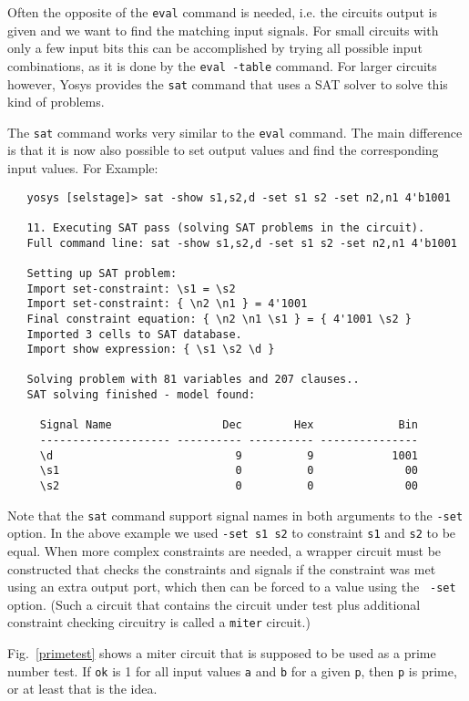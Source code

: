\documentclass[9pt,technote,a4paper]{IEEEtran}
\begin{document}
Often the opposite of the {\tt eval} command is needed, i.e. the circuits
output is given and we want to find the matching input signals. For small
circuits with only a few input bits this can be accomplished by trying all
possible input combinations, as it is done by the {\tt eval -table} command.
For larger circuits however, Yosys provides the {\tt sat} command that uses
a SAT \cite{CircuitSAT} solver \cite{MiniSAT} to solve this kind of problems.

The {\tt sat} command works very similar to the {\tt eval} command. The main
difference is that it is now also possible to set output values and find the
corresponding input values. For Example:

{\scriptsize
\begin{verbatim}
   yosys [selstage]> sat -show s1,s2,d -set s1 s2 -set n2,n1 4'b1001
   
   11. Executing SAT pass (solving SAT problems in the circuit).
   Full command line: sat -show s1,s2,d -set s1 s2 -set n2,n1 4'b1001
   
   Setting up SAT problem:
   Import set-constraint: \s1 = \s2
   Import set-constraint: { \n2 \n1 } = 4'1001
   Final constraint equation: { \n2 \n1 \s1 } = { 4'1001 \s2 }
   Imported 3 cells to SAT database.
   Import show expression: { \s1 \s2 \d }
   
   Solving problem with 81 variables and 207 clauses..
   SAT solving finished - model found:
   
     Signal Name                 Dec        Hex             Bin
     -------------------- ---------- ---------- ---------------
     \d                            9          9            1001
     \s1                           0          0              00
     \s2                           0          0              00
\end{verbatim}
}

Note that the {\tt sat} command support signal names in both arguments
to the {\tt -set} option. In the above example we used {\tt -set s1 s2}
to constraint {\tt s1} and {\tt s2} to be equal. When more complex
constraints are needed, a wrapper circuit must be constructed that
checks the constraints and signals if the constraint was met using an
extra output port, which then can be forced to a value using the {\tt
-set} option. (Such a circuit that contains the circuit under test
plus additional constraint checking circuitry is called a {\tt miter\/}
circuit.)

Fig.~\ref{primetest} shows a miter circuit that is supposed to be used as a
prime number test. If {\tt ok} is 1 for all input values {\tt a} and {\tt b}
for a given {\tt p}, then {\tt p} is prime, or at least that is the idea.
\end{document}

